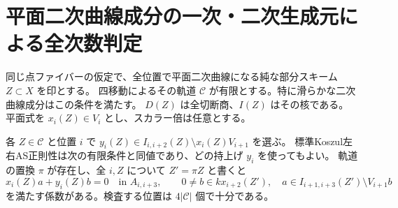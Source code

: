 \section{平面二次曲線成分の一次・二次生成元による全次数判定}
\label{sec:conic-component-as-test}
同じ点ファイバーの仮定で、全位置で平面二次曲線になる純な部分スキーム $Z\subset X$ を印とする。
四移動によるその軌道 $\mathcal C$ が有限とする。特に滑らかな二次曲線成分はこの条件を満たす。
$D(Z)$ は全切断商、$I(Z)$ はその核である。平面式を $x_i(Z)\in V_i$ とし、スカラー倍は任意とする。

\begin{theorem}\label{thm:conic-component-as-test}
各 $Z\in\mathcal C$ と位置 $i$ で
$y_i(Z)\in I_{i,i+2}(Z)\setminus x_i(Z)V_{i+1}$ を選ぶ。
標準Koszul左右AS正則性は次の有限条件と同値であり、どの持上げ $y_i$ を使ってもよい。
軌道の置換 $\pi$ が存在し、全 $i,Z$ について $Z'=\pi Z$ と書くと
\[
 x_i(Z) a + y_i(Z) b=0\quad\text{in } A_{i,i+3},\qquad
 0\ne b\in k x_{i+2}(Z'),\quad
 a\in I_{i+1,i+3}(Z')\setminus V_{i+1}b
\]
を満たす係数がある。検査する位置は $4|\mathcal C|$ 個で十分である。
\end{theorem}
